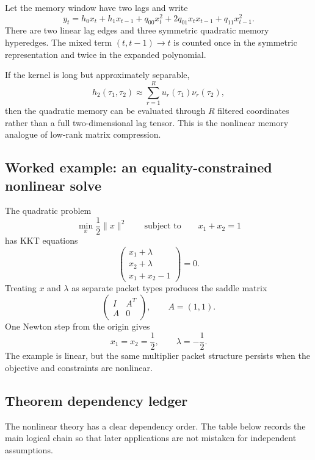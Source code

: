 \documentclass[11pt]{article}
\theoremstyle{definition}
\theoremstyle{remark}
\begin{document}
Let the memory window have two lags and write
\[
y_t
=
h_0x_t+h_1x_{t-1}
+
q_{00}x_t^2
+2q_{01}x_tx_{t-1}
+q_{11}x_{t-1}^2.
\]
There are two linear lag edges and three symmetric quadratic memory hyperedges.  The mixed term $(t,t-1)\to t$ is counted once in the symmetric representation and twice in the expanded polynomial.

If the kernel is long but approximately separable,
\[
h_2(\tau_1,\tau_2)
\approx
\sum_{r=1}^R
u_r(\tau_1)\nu_r(\tau_2),
\]
then the quadratic memory can be evaluated through $R$ filtered coordinates rather than a full two-dimensional lag tensor.  This is the nonlinear memory analogue of low-rank matrix compression.

\subsection{Worked example: an equality-constrained nonlinear solve}

The quadratic problem
\[
\min_x\frac12\|x\|^2
\qquad
\text{subject to}
\qquad
x_1+x_2=1
\]
has KKT equations
\[
\begin{pmatrix}
x_1+\lambda\\
x_2+\lambda\\
x_1+x_2-1
\end{pmatrix}
=0.
\]
Treating $x$ and $\lambda$ as separate packet types produces the saddle matrix
\[
\begin{pmatrix}
I&A^T\\
A&0
\end{pmatrix},
\qquad
A=(1,1).
\]
One Newton step from the origin gives
\[
x_1=x_2=\frac12,
\qquad
\lambda=-\frac12.
\]
The example is linear, but the same multiplier packet structure persists when the objective and constraints are nonlinear.

\subsection{Theorem dependency ledger}

The nonlinear theory has a clear dependency order.  The table below records the main logical chain so that later applications are not mistaken for independent assumptions.
\end{document}
